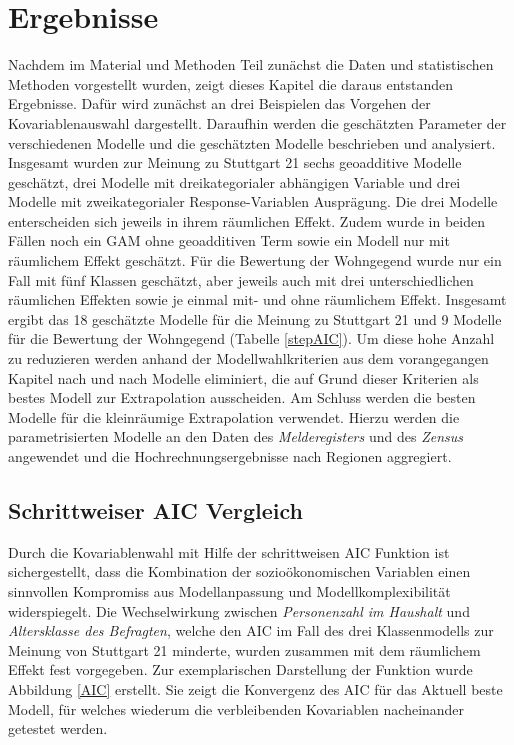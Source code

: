 \documentclass{Vorlage}
\begin{document}
\section{Ergebnisse}
Nachdem im Material und Methoden Teil zunächst die Daten und statistischen Methoden vorgestellt wurden, zeigt dieses Kapitel die daraus entstanden Ergebnisse. Dafür wird zunächst an drei Beispielen das Vorgehen der Kovariablenauswahl dargestellt. Daraufhin werden die geschätzten Parameter der verschiedenen Modelle und die geschätzten Modelle beschrieben und analysiert. Insgesamt wurden zur Meinung zu Stuttgart 21 sechs geoadditive Modelle geschätzt, drei Modelle mit dreikategorialer abhängigen Variable und drei Modelle mit zweikategorialer Response-Variablen Ausprägung. Die drei Modelle enterscheiden sich jeweils in ihrem räumlichen Effekt. Zudem wurde in beiden Fällen noch ein GAM ohne geoadditiven Term sowie ein Modell nur mit räumlichem Effekt geschätzt. Für die Bewertung der Wohngegend wurde nur ein Fall mit fünf Klassen geschätzt, aber jeweils auch mit drei unterschiedlichen räumlichen Effekten sowie je einmal mit- und ohne räumlichem Effekt. Insgesamt ergibt das 18 geschätzte Modelle für die Meinung zu Stuttgart 21 und 9 Modelle für die Bewertung der Wohngegend (Tabelle \ref{stepAIC}). Um diese hohe Anzahl zu reduzieren werden anhand der Modellwahlkriterien aus dem vorangegangen Kapitel nach und nach Modelle eliminiert, die auf Grund dieser Kriterien als bestes Modell zur Extrapolation ausscheiden. Am Schluss werden die besten Modelle für die kleinräumige Extrapolation verwendet. Hierzu werden die parametrisierten Modelle an den Daten des \textit{Melderegisters} und des \textit{Zensus} angewendet und die Hochrechnungsergebnisse nach Regionen aggregiert.

\subsection{Schrittweiser AIC Vergleich}
Durch die Kovariablenwahl mit Hilfe der schrittweisen AIC Funktion ist sichergestellt, dass die Kombination der sozioökonomischen Variablen einen sinnvollen Kompromiss aus Modellanpassung und Modellkomplexibilität widerspiegelt. Die Wechselwirkung zwischen \textit{Personenzahl im Haushalt} und \textit{Altersklasse des Befragten}, welche den AIC im Fall des drei Klassenmodells zur Meinung von Stuttgart 21 minderte, wurden zusammen mit dem räumlichem Effekt fest vorgegeben. Zur exemplarischen Darstellung der Funktion wurde Abbildung \ref{AIC} erstellt. Sie zeigt die Konvergenz des AIC für das Aktuell beste Modell, für welches wiederum die verbleibenden Kovariablen nacheinander getestet werden. 
\end{document}
